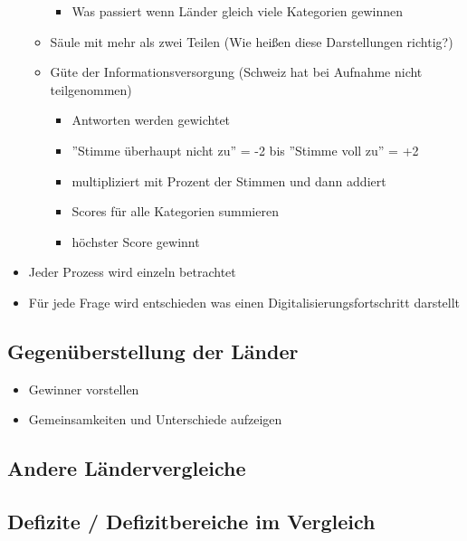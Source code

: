 \begin{itemize}
\begin{itemize}
\begin{itemize}
			\item Was passiert wenn Länder gleich viele Kategorien gewinnen
		\end{itemize}
		\item Säule mit mehr als zwei Teilen (Wie heißen diese Darstellungen richtig?)
		\item Güte der Informationsversorgung (Schweiz hat bei Aufnahme nicht teilgenommen)
		\begin{itemize}
			\item Antworten werden gewichtet
			\item ''Stimme überhaupt nicht zu'' = -2 bis ''Stimme voll zu'' = +2
			\item multipliziert mit Prozent der Stimmen und dann addiert
			\item Scores für alle Kategorien summieren
			\item höchster Score gewinnt
		\end{itemize}
	\end{itemize}
	\item Jeder Prozess wird einzeln betrachtet
	\item Für jede Frage wird entschieden was einen Digitalisierungsfortschritt darstellt
\end{itemize}

\subsection{Gegenüberstellung der Länder}
\begin{itemize}
	\item Gewinner vorstellen
	\item Gemeinsamkeiten und Unterschiede aufzeigen
\end{itemize}
\subsection{Andere Ländervergleiche}
\subsection{Defizite / Defizitbereiche im Vergleich}